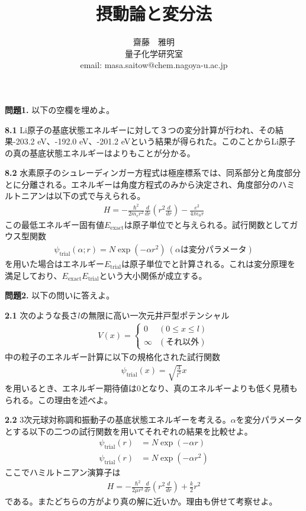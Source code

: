 \documentclass[11pt,pra,aps]{revtex4}
\newcommand{\boxz}[1]{\boxed{\phantom{\text{#1}}}}
\begin{document}
\title{摂動論と変分法}
\author{齋藤　雅明 \\ 量子化学研究室 \\ email: masa.saitow@chem.nagoya-u.ac.jp}

\maketitle

\noindent
{\bf 問題1.} 以下の空欄を埋めよ。

\noindent
{\bf 8.1} Li原子の基底状態エネルギーに対して３つの変分計算が行われ、その結果-203.2 eV、-192.0 eV、-201.2 eVという結果が得られた。このことからLi原子の真の基底状態エネルギーは\boxz{-203.2 eV}よりも\boxz{低い}ことが分かる。

\noindent
{\bf 8.2} 水素原子のシュレーディンガー方程式は極座標系では、同系部分と角度部分とに分離される。エネルギーは角度方程式のみから決定され、角度部分のハミルトニアンは以下の式で与えられる。
\begin{align}
  H = -\frac{\hbar^2}{2m_e r^2}\frac{d}{dr}\left(r^2\frac{d}{dr}\right)-\frac{e^2}{4\pi\epsilon_0 r}
\end{align}
この最低エネルギー固有値$E_\text{exact}$は原子単位で\boxz{-0.5}と与えられる。試行関数としてガウス型関数
\begin{align}
  \psi_\text{trial}(\alpha;r)=N\exp\left(-\alpha r^2\right) \ (\alpha\text{は変分パラメータ})
\end{align}
を用いた場合はエネルギー$E_\text{trial}$は原子単位で\boxz{}と計算される。これは変分原理を満足しており、$E_\text{exact}$\boxz{$\leq$}$E_\text{trial}$という大小関係が成立する。

\noindent
{\bf 問題2.} 以下の問いに答えよ。

\noindent
{\bf 2.1} 次のような長さ$l$の無限に高い一次元井戸型ポテンシャル
\begin{align}
  V(x)=\left\{
  \begin{array}{cc}
    0 & (0 \leq x \leq l) \\
    \infty & (\text{それ以外})
  \end{array}
  \right.
\end{align}
中の粒子のエネルギー計算に以下の規格化された試行関数
\begin{align}
  \psi_\text{trial}(x) = \sqrt{\frac{3}{l^3}}x
\end{align}
を用いるとき、エネルギー期待値は0となり、真のエネルギーよりも低く見積もられる。この理由を述べよ。

\noindent
{\bf 2.2} 3次元球対称調和振動子の基底状態エネルギーを考える。$\alpha$を変分パラメータとする以下の二つの試行関数を用いてそれぞれの結果を比較せよ。
\begin{align}
  \psi_\text{trial}(r)&=N\exp\left(-\alpha r\right) \\
  \psi_\text{trial}(r)&=N\exp\left(-\alpha r^2\right)
\end{align}
ここでハミルトニアン演算子は
\begin{align}
  H=-\frac{\hbar^2}{2\mu r^2}\frac{d}{dr}\left(r^2\frac{d}{dr}\right)+\frac{k}{2}r^2
\end{align}
である。またどちらの方がより真の解に近いか。理由も併せて考察せよ。
\end{document}
